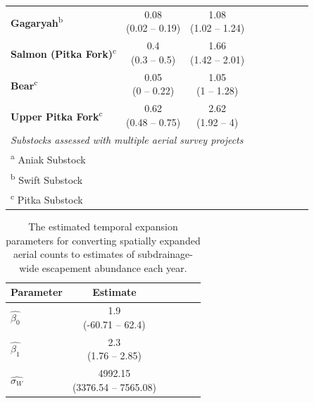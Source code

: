 \documentclass[12pt,]{book}
\theoremstyle{definition}
\theoremstyle{definition}
\theoremstyle{definition}
\theoremstyle{remark}
\begin{document}
\begin{table}
\begin{tabular}[t]{lcclcclcc}
\textbf{Gagaryah}\textsuperscript{b} & \makecell[c]{0.08\\(0.02 -- 0.19)} & \makecell[c]{1.08\\(1.02 -- 1.24)}\\
\textbf{Salmon (Pitka Fork)}\textsuperscript{c} & \makecell[c]{0.4\\(0.3 -- 0.5)} & \makecell[c]{1.66\\(1.42 -- 2.01)}\\
\textbf{Bear}\textsuperscript{c} & \makecell[c]{0.05\\(0 -- 0.22)} & \makecell[c]{1.05\\(1 -- 1.28)}\\
\textbf{Upper Pitka Fork}\textsuperscript{c} & \makecell[c]{0.62\\(0.48 -- 0.75)} & \makecell[c]{2.62\\(1.92 -- 4)}\\
\bottomrule
\multicolumn{9}{l}{\textit{Substocks assessed with multiple aerial survey projects}}\\
\multicolumn{9}{l}{\textsuperscript{a} Aniak Substock}\\
\multicolumn{9}{l}{\textsuperscript{b} Swift Substock}\\
\multicolumn{9}{l}{\textsuperscript{c} Pitka Substock}\\
\end{tabular}
\end{table}

\clearpage

\begin{table}

\caption{\label{tab:temp-expand-table}The estimated temporal expansion parameters for converting spatially expanded aerial counts to estimates of subdrainage-wide escapement abundance each year.}
\centering
\begin{tabular}[t]{lcclcc}
\toprule
\textbf{Parameter} & \textbf{Estimate}\\
\midrule
$\hat{\beta_0}$ & \makecell[c]{1.9\\(-60.71 -- 62.4)}\\
$\hat{\beta_1}$ & \makecell[c]{2.3\\(1.76 -- 2.85)}\\
$\hat{\sigma_W}$ & \makecell[c]{4992.15\\(3376.54 -- 7565.08)}\\
\bottomrule
\end{tabular}
\end{table}
\end{document}
